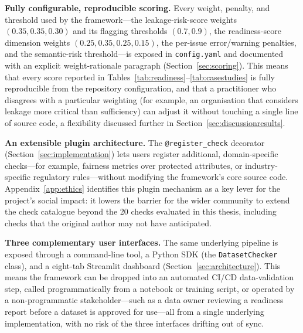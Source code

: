 \documentclass[12pt,a4paper]{report}
\begin{document}
\textbf{Fully configurable, reproducible scoring.}  Every weight, penalty, and threshold used
by the framework---the leakage-risk-score weights $(0.35, 0.35, 0.30)$ and its flagging
thresholds $(0.7, 0.9)$, the readiness-score dimension weights $(0.25, 0.35, 0.25, 0.15)$, the
per-issue error/warning penalties, and the semantic-risk threshold---is exposed in
\texttt{config.yaml} and documented with an explicit weight-rationale paragraph
(Section~\ref{sec:scoring}).  This means that every score reported in
Tables~\ref{tab:readiness}--\ref{tab:casestudies} is fully reproducible from the repository
configuration, and that a practitioner who disagrees with a particular weighting (for
example, an organisation that considers leakage more critical than sufficiency) can adjust it
without touching a single line of source code, a flexibility discussed further in
Section~\ref{sec:discussionresults}.

\textbf{An extensible plugin architecture.}  The \texttt{@register\_check} decorator
(Section~\ref{sec:implementation}) lets users register additional, domain-specific checks---for
example, fairness metrics over protected attributes, or industry-specific regulatory
rules---without modifying the framework's core source code.  Appendix~\ref{app:ethics}
identifies this plugin mechanism as a key lever for the project's social impact: it lowers
the barrier for the wider community to extend the check catalogue beyond the 20 checks
evaluated in this thesis, including checks that the original author may not have anticipated.

\textbf{Three complementary user interfaces.}  The same underlying pipeline is exposed
through a command-line tool, a Python SDK (the \texttt{DatasetChecker} class), and a
eight-tab Streamlit dashboard (Section~\ref{sec:architecture}).  This means the framework can
be dropped into an automated CI/CD data-validation step, called programmatically from a
notebook or training script, or operated by a non-programmatic stakeholder---such as a data
owner reviewing a readiness report before a dataset is approved for use---all from a single
underlying implementation, with no risk of the three interfaces drifting out of sync.
\end{document}
